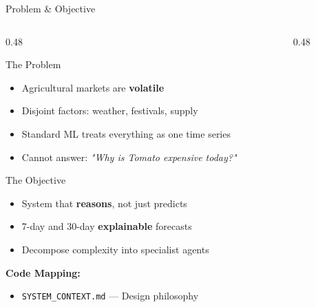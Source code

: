 \documentclass[aspectratio=169]{beamer}
\begin{document}

\begin{frame}{Problem \& Objective}
\begin{columns}[T]
  \begin{column}{0.48\textwidth}
    \begin{alertblock}{The Problem}
      \begin{itemize}\setlength\itemsep{3pt}
        \item Agricultural markets are \textbf{volatile}
        \item Disjoint factors: weather, festivals, supply
        \item Standard ML treats everything as one time series
        \item Cannot answer: \textit{"Why is Tomato expensive today?"}
      \end{itemize}
    \end{alertblock}
    \vspace{0.25cm}
    \begin{block}{The Objective}
      \begin{itemize}\setlength\itemsep{3pt}
        \item System that \textbf{reasons}, not just predicts
        \item 7-day and 30-day \textbf{explainable} forecasts
        \item Decompose complexity into specialist agents
      \end{itemize}
    \end{block}
    \vspace{0.15cm}
    \textbf{Code Mapping:}
    \begin{itemize}
      \item \texttt{SYSTEM\_CONTEXT.md} — Design philosophy
    \end{itemize}
  \end{column}
  \begin{column}{0.48\textwidth}
    \centering
\end{column}
\end{columns}
\end{frame}
\end{document}
